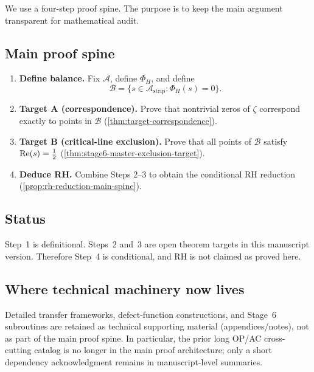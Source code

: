 We use a four-step proof spine.
The purpose is to keep the main argument transparent for mathematical audit.

\subsection*{Main proof spine}
\begin{enumerate}
  \item \textbf{Define balance.}
  Fix $\mathcal{A}$, define $\Phi_H$, and define
  \[
  \mathcal{B}=\{s\in\mathcal{A}_{\mathrm{strip}}:\Phi_H(s)=0\}.
  \]

  \item \textbf{Target A (correspondence).}
  Prove that nontrivial zeros of $\zeta$ correspond exactly to points in $\mathcal{B}$
  (\cref{thm:target-correspondence}).

  \item \textbf{Target B (critical-line exclusion).}
  Prove that all points of $\mathcal{B}$ satisfy $\operatorname{Re}(s)=\tfrac12$
  (\cref{thm:stage6-master-exclusion-target}).

  \item \textbf{Deduce RH.}
  Combine Steps 2--3 to obtain the conditional RH reduction
  (\cref{prop:rh-reduction-main-spine}).
\end{enumerate}

\subsection*{Status}
Step~1 is definitional.
Steps~2 and~3 are open theorem targets in this manuscript version.
Therefore Step~4 is conditional, and RH is not claimed as proved here.

\subsection*{Where technical machinery now lives}
Detailed transfer frameworks, defect-function constructions, and Stage~6 subroutines are retained as technical supporting material (appendices/notes), not as part of the main proof spine. In particular, the prior long OP/AC cross-cutting catalog is no longer in the main proof architecture; only a short dependency acknowledgment remains in manuscript-level summaries.
